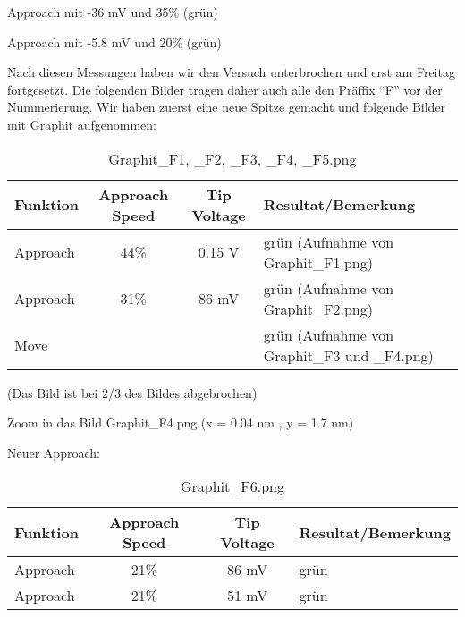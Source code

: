 


Approach mit -36 mV und 35\% (grün)


Approach mit -5.8 mV und 20\% (grün)


Nach diesen Messungen haben wir den Versuch unterbrochen und erst am Freitag fortgesetzt. Die folgenden Bilder tragen daher auch alle den Präffix "`F"' vor der Nummerierung. Wir haben zuerst eine neue Spitze gemacht und folgende Bilder mit Graphit aufgenommen:

\begin{table}[H]
\caption{Graphit\_F1, \_F2, \_F3, \_F4, \_F5.png}
\centering \begin{tabular}[H]{l c c l}
Funktion & Approach Speed & Tip Voltage & Resultat/Bemerkung\\ \hline
Approach & 44\% & 0.15 V & grün (Aufnahme von Graphit\_F1.png)\\
Approach & 31\% & 86 mV & grün (Aufnahme von Graphit\_F2.png)\\
Move & & & grün (Aufnahme von Graphit\_F3 und \_F4.png)
\end{tabular}
\end{table}




(Das Bild ist bei 2/3 des Bildes abgebrochen) 

Zoom in das Bild Graphit\_F4.png (x = 0.04 nm , y = 1.7 nm)

Neuer Approach:

\begin{table}[H]
\caption{Graphit\_F6.png}
\centering \begin{tabular}[H]{l c c l}
Funktion & Approach Speed & Tip Voltage & Resultat/Bemerkung\\ \hline
Approach & 21\% & 86 mV & grün\\ 
Approach & 21\% & 51 mV & grün
\end{tabular}
\end{table}

